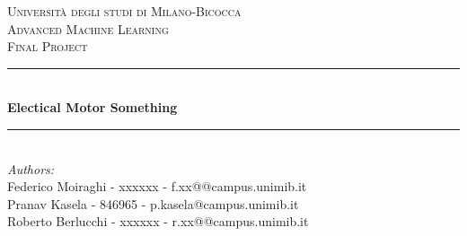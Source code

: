 \begin{titlepage}

\newcommand{\HRule}{\rule{\linewidth}{0.5mm}} %

\center %
 

\textsc{\LARGE Università degli studi di Milano-Bicocca}\\[1cm] %
\textsc{\Large Advanced Machine Learning }\\[0.3cm] %
\textsc{\large Final Project}\\[0.1cm] %


\HRule \\[0.4cm]
{ \huge \bfseries Electical Motor Something}\\[0.2cm] %
\HRule \\[1.5cm]
 

\large
\emph{Authors:}\\
Federico Moiraghi - xxxxxx - f.xx@@campus.unimib.it\\
Pranav Kasela - 846965 - p.kasela@campus.unimib.it \\   %
Roberto Berlucchi - xxxxxx - r.xx@@campus.unimib.it   \\[0.5cm] %




\end{titlepage}
